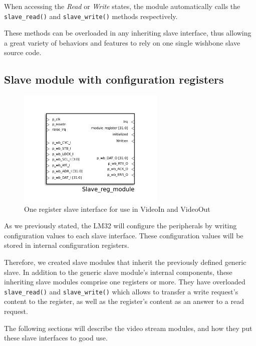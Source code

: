 When accessing the \emph{Read} or \emph{Write} states, the module automatically calls the \texttt{slave\_read()} and \texttt{slave\_write()} methods respectively.

These methods can be overloaded in any inheriting slave interface, thus allowing a great variety of behaviors and features to rely on one single wishbone slave source code.

\subsection{Slave module with configuration registers}
\label{wb_reg_slave}

\begin{figure}[H]
\center
\includegraphics[width=7cm]{figs/slave_reg_hdl_symbol.pdf}
\caption{One register slave interface for use in VideoIn and VideoOut}
\label{reg_slave_interface}
\end{figure}



As we previously stated, the LM32 will configure the peripherals by writing configuration values to each slave interface.
These configuration values will be stored in internal configuration registers.

Therefore, we created slave modules that inherit the previously defined generic slave.
In addition to the generic slave module's internal components, these inheriting slave modules comprise one registers or more.
They have overloaded \texttt{slave\_read()} and \texttt{slave\_write()} which allows to transfer a write request's content to the register, as well as the register's content as an answer to a read request.

The following sections will describe the video stream modules, and how they put these slave interfaces to good use.
